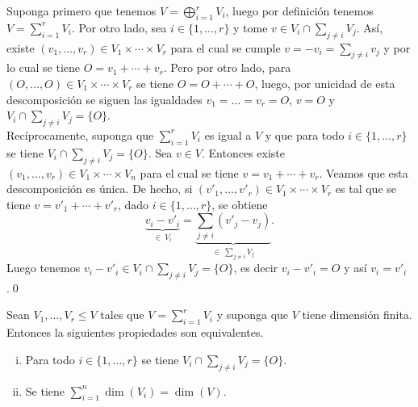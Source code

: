 \dem Suponga primero que tenemos $V=\bigoplus_{i=1}^r V_i$, luego por definici\'on tenemos $V=\sum_{i=1}^r V_i$. Por otro lado, sea $i\in\{1,\ldots,r\}$ y tome $v\in V_i\cap\sum_{j\ne i} V_j$. As\'i, existe $(v_1,\ldots,v_r)\in V_1\times\cdots\times V_r$ para el cual se cumple $v=-v_i=\sum_{j\ne i} v_j$ y por lo cual se tiene $O=v_1+\cdots+v_r$. Pero por otro lado, para $(O,\ldots,O)\in V_1\times\cdots\times V_r$ se tiene $O=O+\cdots+O$, luego, por unicidad de esta descomposici\'on se siguen las igualdades $v_1=\ldots=v_r=O$, $v=O$ y $V_i\cap\sum_{j\ne i} V_j=\{O\}$.\\
Rec\'iprocamente, suponga que $\sum_{i=1}^r V_i$ es igual a $V$ y que para todo $i\in\{1,\ldots,r\}$ se tiene $V_i\cap\sum_{j\ne i} V_j=\{O\}$. Sea $v\in V$. Entonces existe $(v_1,\ldots,v_r)\in V_1\times\cdots\times V_n$ para el cual se tiene $v=v_1+\cdots+v_r$. Veamos que esta descomposici\'on es \'unica. De hecho, si $(v'_1,\ldots,v'_r)\in V_1\times\cdots\times V_r$ es tal que se tiene $v=v'_1+\cdots+v'_r$, dado $i\in\{1,\ldots,r\}$, se obtiene
\[
\underbrace{v_i-v'_i}_{\in\ V_i}=\underbrace{\sum_{j\ne i} (v'_j-v_j)}_{\in\ \sum_{j\ne i} V_j}.
\]
Luego tenemos $v_i-v'_i\in V_i\cap\sum_{j\ne i} V_j=\{O\}$, es decir $v_i-v'_i=O$ y as\'i $v_i=v'_i$.\qed

\begin{prop}
Sean $V_1,\ldots, V_r\le V$ tales que $V=\sum_{i=1}^r V_i$ y suponga que $V$ tiene dimensi\'on finita. Entonces la siguientes propiedades son equivalentes.
\begin{enumerate}[(i)]
\item Para todo $i\in\{1,\ldots,r\}$ se tiene $V_i\cap\sum_{j\ne i} V_j=\{O\}$.
\item Se tiene $\sum_{i=1}^n \dim(V_i)=\dim(V)$.
\end{enumerate}
\end{prop}

